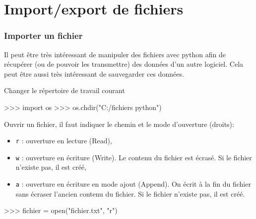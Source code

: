 \section{Import/export de fichiers}

\begin{frame}[fragile]
\frametitle{Importer un fichier}

Il peut être très intéressant de manipuler des fichiers avec python afin de récupérer (ou de pouvoir les transmettre) des données d'un autre logiciel. Cela peut être aussi très intéressant de sauvegarder ces données.

\begin{minipage}[t]{0.38\linewidth}
Changer le répertoire de travail courant
\end{minipage}\hfill
\begin{minipage}[t]{0.58\linewidth}
\vspace{-0.5cm}
\begin{GrayBox}[0.85\textwidth]
\begin{verbatimtab}[3]
>>> import os
>>> os.chdir("C:/fichiers python")
\end{verbatimtab}
\end{GrayBox}
\end{minipage}

Ouvrir un fichier, il faut indiquer le chemin et le mode d'ouverture (droits):
\begin{itemize}
 \item \verb?r? : ouverture en lecture (Read),
 \item \verb?w? : ouverture en écriture (Write). Le contenu du fichier est écrasé. Si le fichier n'existe pas, il est créé,
 \item \verb?a? : ouverture en écriture en mode ajout (Append). On écrit à la fin du fichier sans écraser l'ancien contenu du fichier. Si le fichier n'existe pas, il est créé.
\end{itemize}

\begin{GrayBox}[0.85\textwidth]
\begin{verbatimtab}[3]
>>> fichier = open("fichier.txt", "r")
\end{verbatimtab}
\end{GrayBox}
\end{frame}

